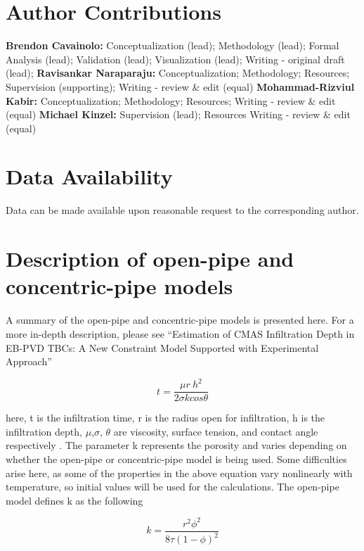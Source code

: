 \documentclass[%
 aip,
 amsmath,amssymb,
 reprint,%
]{revtex4-1}
\begin{document}
\section*{Author Contributions}
\textbf{Brendon Cavainolo:} Conceptualization (lead); Methodology (lead); Formal Analysis (lead); Validation (lead); Visualization (lead); Writing - original draft (lead);
\textbf{Ravisankar Naraparaju:} Conceptualization; Methodology; Resources; Supervision (supporting); Writing - review \& edit (equal)
\textbf{Mohammad-Rizviul Kabir:} Conceptualization; Methodology; Resources; Writing - review \& edit (equal)
\textbf{Michael Kinzel:} Supervision (lead); Resources Writing - review \& edit (equal)


\section*{Data Availability}
Data can be made available upon reasonable request to the corresponding author.

\appendix
\section{Description of open-pipe and concentric-pipe models}
\label{sec:app:RaviPipeModels}
A summary of the open-pipe and concentric-pipe models is presented here. For a more in-depth description, please see ``Estimation
of CMAS Infiltration Depth in EB-PVD TBCs: A New Constraint Model Supported with Experimental Approach''

\begin{equation}
    t=\frac{\mu r\ h^2}{2\sigma k cos\theta}
    \label{eq:PM_base}
\end{equation}

\noindent here, t is the infiltration time, r is the radius open for infiltration, h is the infiltration depth, $\mu$,$ \sigma$, $\theta$ are viscosity, surface tension, and contact angle respectively \cite{Naraparaju2017,ZHAO201474}. The parameter k represents the porosity and varies depending on whether the open-pipe or concentric-pipe model is being used. Some difficulties arise here, as some of the properties in the above equation vary nonlinearly with temperature, so initial values will be used for the calculations. The open-pipe model defines k as the following

\begin{equation}
    k=\frac{r^2\phi^2}{8\tau\left(1-\phi\right)^2}
    \label{eq:oPM}
\end{equation}
\end{document}
